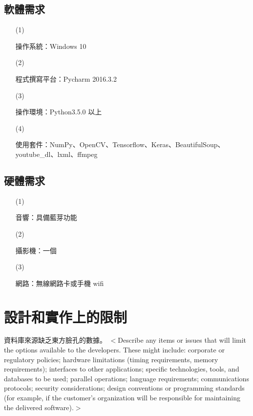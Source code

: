 \documentclass[12pt]{scrreprt}
\begin{document}
\subsection{軟體需求}
\begin{itemize}
\item[(1)]{\begin{bfseries}{操作系統：}Windows 10\end{bfseries}}
\item[(2)]{\begin{bfseries}{程式撰寫平台：}Pycharm 2016.3.2\end{bfseries}}
\item[(3)]{\begin{bfseries}{操作環境：}Python3.5.0 以上\end{bfseries}}
\item[(4)]{\begin{bfseries}{使用套件：}NumPy、OpenCV、Tensorflow、Keras、BeautifulSoup、\\
youtube_dl、lxml、ffmpeg\end{bfseries}}%
\end{itemize}

\subsection{硬體需求}
\begin{itemize}
\item[(1)]{\begin{bfseries}{音響：}具備藍芽功能\end{bfseries}}
\item[(2)]{\begin{bfseries}{攝影機：}一個\end{bfseries}}
\item[(3)]{\begin{bfseries}{網路：}無線網路卡或手機 wifi\end{bfseries}}

\end{itemize}

\section{設計和實作上的限制}
資料庫來源缺乏東方臉孔的數據。
$<$Describe any items or issues that will limit the options available to the 
developers. These might include: corporate or regulatory policies; hardware 
limitations (timing requirements, memory requirements); interfaces to other 
applications; specific technologies, tools, and databases to be used; parallel 
operations; language requirements; communications protocols; security 
considerations; design conventions or programming standards (for example, if the 
customer’s organization will be responsible for maintaining the delivered 
software).$>$
\end{document}

